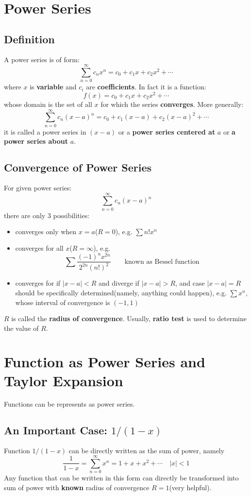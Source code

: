 \documentclass[10pt,a4paper,oneside]{article}
\begin{document}
\section{Power Series}

\subsection{Definition}
A power series is of form:
\[
\sum_{n=0}^{\infty} c_n x^n = c_0 + c_1 x + c_2 x^2 + \cdots
\]
where $x$ is \textbf{variable} and $c_i$ are \textbf{coefficients}. In fact it is a function:
\[
f(x) = c_0 + c_1 x + c_2 x^2 + \cdots
\]
whose domain is the set of all $x$ for which the series \textbf{converges}. More generally:
\[
\sum_{n=0}^{\infty} c_n (x-a)^n = c_0 + c_1 (x-a) + c_2 (x-a)^2 + \cdots
\]
it is called a power series in $(x-a)$ or a \textbf{power series centered at} $a$ or \textbf{a power series about} $a$.

\subsection{Convergence of Power Series}
For given power series:
\[
\sum_{n=0}^{\infty} c_n (x-a)^n
\]
there are only $3$ possibilities:
\begin{itemize}
	\item converges only when $x=a$($R=0$), e.g. $\sum n!x^n$
	\item converges for all $x$($R=\infty$), e.g. 
	\[
	\sum \frac{(-1)^n x^{2n}}{2^{2n} (n!)^2} \qquad \text{known as Bessel function}
	\]
	\item converges for if $|x-a|<R$ and diverge if $|x-a|>R$, and case $|x-a| = R$ should be specifically determined(namely, anything could happen), e.g. $\sum x^n$, whose interval of convergence is $(-1, 1)$
\end{itemize}
$R$ is called the \textbf{radius of convergence}.  Usually, \textbf{ratio test} is used to determine the value of $R$.

\section{Function as Power Series and Taylor Expansion}
Functions can be represents as power series.

\subsection{An Important Case: $1/(1-x)$}
Function $1/(1-x)$ can be directly written as the sum of power, namely
\[
\frac{1}{1-x} = \sum_{n=0}^{\infty} x^n = 1 + x + x^2 + \cdots \quad |x|<1 
\]
Any function that can be written in this form can directly be transformed into sum of power with \textbf{known} radius of convergence $R=1$(very helpful).
\end{document}
